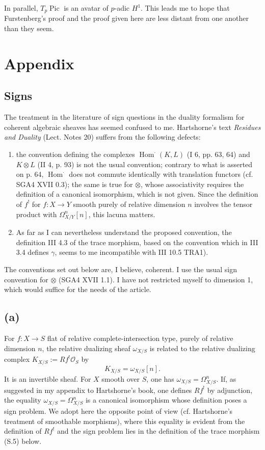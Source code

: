 \documentclass[11pt]{article}
\DeclareMathOperator{\Pic}{Pic}
\DeclareMathOperator{\Hom}{Hom}
\newcommand{\OO}{\mathcal O}
\begin{document}
In parallel, $T_p\Pic$ is an avatar of $p$-adic $H^1$. This leads me to hope that Furstenberg's proof and the proof given here are less distant from one another than they seem.

\appendix
\section*{Appendix}
\subsection*{Signs}

The treatment in the literature of sign questions in the duality formalism for coherent algebraic sheaves has seemed confused to me. Hartshorne's text \emph{Residues and Duality} (Lect. Notes 20) suffers from the following defects:
\begin{enumerate}[label=(\alph*)]
\item the convention defining the complexes $\Hom^\cdot(K,L)$ (I 6, pp. 63, 64) and $K\otimes L$ (II 4, p. 93) is not the usual convention; contrary to what is asserted on p. 64, $\Hom^\cdot$ does not commute identically with translation functors (cf. SGA4 XVII 0.3); the same is true for $\otimes$, whose associativity requires the definition of a canonical isomorphism, which is not given. Since the definition of $f^!$ for $f:X\to Y$ smooth purely of relative dimension $n$ involves the tensor product with $\Omega^n_{X/Y}[n]$, this lacuna matters.
\item As far as I can nevertheless understand the proposed convention, the definition III 4.3 of the trace morphism, based on the convention which in III 3.4 defines $\gamma$, seems to me incompatible with III 10.5 TRA1).
\end{enumerate}
The conventions set out below are, I believe, coherent. I use the usual sign convention for $\otimes$ (SGA4 XVII 1.1). I have not restricted myself to dimension 1, which would suffice for the needs of the article.

\subsection*{(a)}
For $f:X\to S$ flat of relative complete-intersection type, purely of relative dimension $n$, the relative dualizing sheaf $\omega_{X/S}$ is related to the relative dualizing complex $K_{X/S}:=Rf^!\OO_S$ by
\begin{equation}
        K_{X/S}=\omega_{X/S}[n]. \tag{S.1}
\end{equation}
It is an invertible sheaf. For $X$ smooth over $S$, one has $\omega_{X/S}=\Omega^n_{X/S}$. If, as suggested in my appendix to Hartshorne's book, one defines $Rf^!$ by adjunction, the equality $\omega_{X/S}=\Omega^n_{X/S}$ is a canonical isomorphism whose definition poses a sign problem. We adopt here the opposite point of view (cf. Hartshorne's treatment of smoothable morphisms), where this equality is evident from the definition of $Rf^!$ and the sign problem lies in the definition of the trace morphism (S.5) below.
\end{document}
